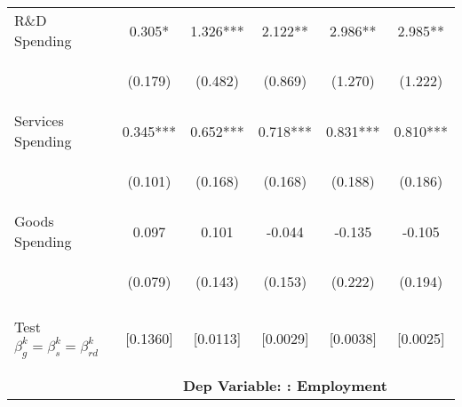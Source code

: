 \begin{tabular}{lccccc}
    R\&D Spending & 0.305* & 1.326*** & 2.122** & 2.986** & 2.985** \\
     & \begin{footnotesize}(0.179)\end{footnotesize} & \begin{footnotesize}(0.482)\end{footnotesize} & \begin{footnotesize}(0.869)\end{footnotesize} & \begin{footnotesize}(1.270)\end{footnotesize} & \begin{footnotesize}(1.222)\end{footnotesize} \\
    Services Spending & 0.345*** & 0.652*** & 0.718*** & 0.831*** & 0.810*** \\
     & \begin{footnotesize}(0.101)\end{footnotesize} & \begin{footnotesize}(0.168)\end{footnotesize} & \begin{footnotesize}(0.168)\end{footnotesize} & \begin{footnotesize}(0.188)\end{footnotesize} & \begin{footnotesize}(0.186)\end{footnotesize} \\
    Goods Spending & 0.097 & 0.101 & -0.044 & -0.135 & -0.105 \\
     & \begin{footnotesize}(0.079)\end{footnotesize} & \begin{footnotesize}(0.143)\end{footnotesize} & \begin{footnotesize}(0.153)\end{footnotesize} & \begin{footnotesize}(0.222)\end{footnotesize} & \begin{footnotesize}(0.194)\end{footnotesize} \\
   \\
   Test $\beta^k_g=\beta^k_s=\beta^k_{rd}$  &  [0.1360]  & [0.0113] & [0.0029] & [0.0038] & [0.0025] \\
   \\
    \hline
    \vspace{-2pt} & \vspace{-2pt} & \vspace{-2pt} & \vspace{-2pt} & \vspace{-2pt} \\
    & \multicolumn{5}{c}{\textbf{Dep Variable: : Employment}} \\ 
    \cmidrule{2-6}
    

\end{tabular}
